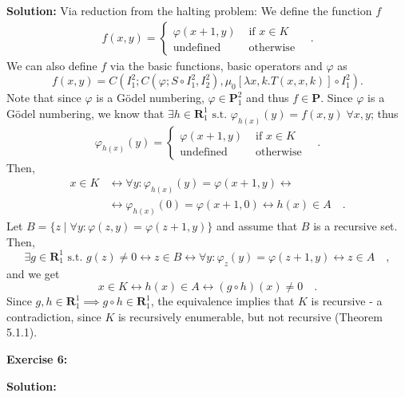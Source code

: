\documentclass [11pt]{article}
\newcommand{\R}{\textbf{R}}
\renewcommand{\P}{\textbf{P}}
\newcommand{\lra}{\ensuremath{\leftrightarrow}}
\begin{document}
\noindent
\textbf{Solution:} 
Via reduction from the halting problem:
We define the function $f$
\begin{align*}
 f(x,y) = \begin{cases}
           \varphi(x+1,y) & \text{ if } x \in K \\
           \text{undefined} & \text{ otherwise} 
          \end{cases} \quad .
\end{align*} 
We can also define $f$ via the basic functions, basic operators and $\varphi$ as
$$
f(x,y) = C(I^2_1; C(\varphi; S \circ I^2_1, I^2_2), \mu_0 [\lambda x,k.T(x,x,k)]\circ I^2_1).
$$
Note that since $\varphi$ is a G\"odel numbering, $\varphi \in \P^2_1$ and thus $f \in \P$.
Since $\varphi$ is a G\"odel numbering, we know that $\exists h \in \R^1_1 \text{ s.t.\ } \varphi_{h(x)}(y) = f(x,y) \;\forall x,y$; thus
$$
\varphi_{h(x)}(y) = \begin{cases}
           \varphi(x+1,y) & \text{ if } x \in K \\
           \text{undefined} & \text{ otherwise}
          \end{cases} \quad.
$$
Then,
\begin{align*}
x \in K &\lra \forall y: \varphi_{h(x)}(y) = \varphi(x+1,y) \lra \\
&\lra \varphi_{h(x)}(0) = \varphi(x+1,0) \lra h(x) \in A \quad . 
\end{align*}
Let $B = \{z \mid \forall y: \varphi(z,y) =  \varphi(z+1,y)\}$ and assume that $B$ is a recursive set.
Then, 
$$
\exists g \in \R^1_1 \text{ s.t.\ } g(z) \neq 0 \lra z \in B \lra \forall y: \varphi_z(y) = \varphi(z+1,y) \lra z \in A \quad ,
$$
and we get 
$$
x \in K \lra h(x) \in A \lra (g \circ h)(x) \neq 0 \quad .
$$
Since $g,h \in \R^1_1 \implies g\circ h \in \R^1_1$, the equivalence implies that $K$ is recursive - a contradiction, since $K$ is recursively enumerable, but not recursive (Theorem 5.1.1).

\bigskip
\noindent
\textbf{Exercise 6:}

\noindent
\textbf{Solution:}
\end{document}
